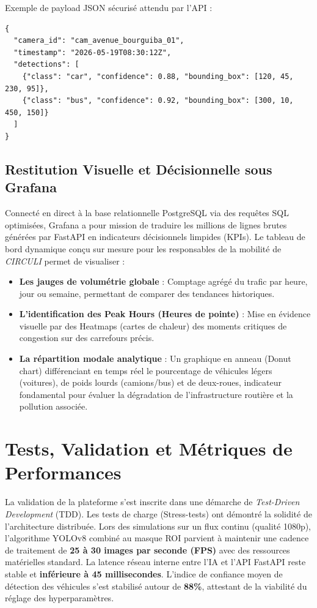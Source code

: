 Exemple de payload JSON sécurisé attendu par l'API :
\begin{verbatim}
{
  "camera_id": "cam_avenue_bourguiba_01",
  "timestamp": "2026-05-19T08:30:12Z",
  "detections": [
    {"class": "car", "confidence": 0.88, "bounding_box": [120, 45, 230, 95]},
    {"class": "bus", "confidence": 0.92, "bounding_box": [300, 10, 450, 150]}
  ]
}
\end{verbatim}

\subsection{Restitution Visuelle et Décisionnelle sous Grafana}
Connecté en direct à la base relationnelle PostgreSQL via des requêtes SQL optimisées, Grafana a pour mission de traduire les millions de lignes brutes générées par FastAPI en indicateurs décisionnels limpides (KPIs).
Le tableau de bord dynamique conçu sur mesure pour les responsables de la mobilité de \textit{CIRCULI} permet de visualiser :
\begin{itemize}
    \item \textbf{Les jauges de volumétrie globale} : Comptage agrégé du trafic par heure, jour ou semaine, permettant de comparer des tendances historiques.
    \item \textbf{L'identification des Peak Hours (Heures de pointe)} : Mise en évidence visuelle par des Heatmaps (cartes de chaleur) des moments critiques de congestion sur des carrefours précis.
    \item \textbf{La répartition modale analytique} : Un graphique en anneau (Donut chart) différenciant en temps réel le pourcentage de véhicules légers (voitures), de poids lourds (camions/bus) et de deux-roues, indicateur fondamental pour évaluer la dégradation de l'infrastructure routière et la pollution associée.
\end{itemize}

\section{Tests, Validation et Métriques de Performances}
La validation de la plateforme s'est inscrite dans une démarche de \textit{Test-Driven Development} (TDD). Les tests de charge (Stress-tests) ont démontré la solidité de l'architecture distribuée. 
Lors des simulations sur un flux continu (qualité 1080p), l'algorithme YOLOv8 combiné au masque ROI parvient à maintenir une cadence de traitement de \textbf{25 à 30 images par seconde (FPS)} avec des ressources matérielles standard. La latence réseau interne entre l'IA et l'API FastAPI reste stable et \textbf{inférieure à 45 millisecondes}. L'indice de confiance moyen de détection des véhicules s'est stabilisé autour de \textbf{88\%}, attestant de la viabilité du réglage des hyperparamètres.


